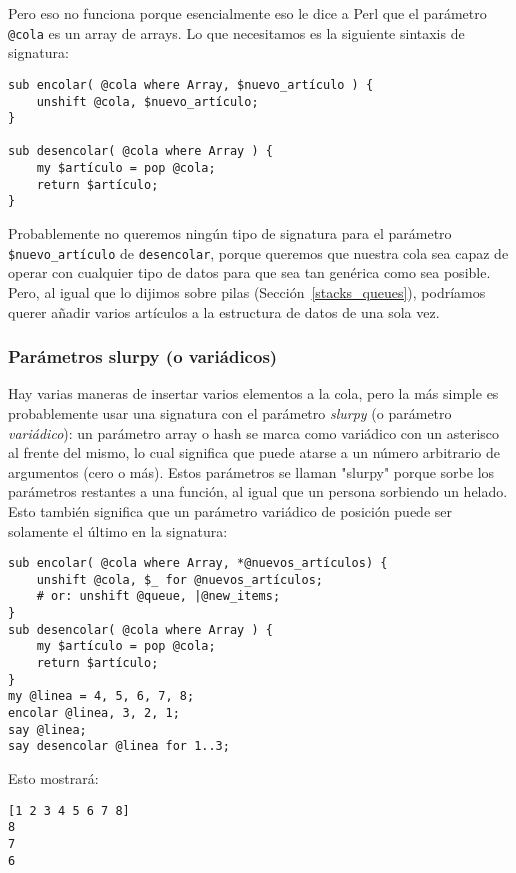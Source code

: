 Pero eso no funciona porque esencialmente eso le dice a Perl
que el parámetro \verb|@cola| es un array de arrays. Lo que necesitamos
es la siguiente sintaxis de signatura:

\begin{verbatim}
sub encolar( @cola where Array, $nuevo_artículo ) {
	unshift @cola, $nuevo_artículo;
}

sub desencolar( @cola where Array ) {
	my $artículo = pop @cola;
	return $artículo;
}	
\end{verbatim}

Probablemente no queremos ningún tipo de signatura para el
parámetro \verb|$nuevo_artículo| de {\tt desencolar}, porque 
queremos que nuestra cola sea capaz de operar con cualquier 
tipo de datos para que sea tan genérica como sea
posible. Pero, al igual que lo dijimos sobre pilas (Sección~\ref{stacks_queues}), 
podríamos querer añadir varios artículos a la estructura de
datos de una sola vez.

\subsubsection{Parámetros slurpy (o variádicos)}

\label{slurpy_params}
Hay varias maneras de insertar varios elementos a la cola,
pero la más simple es probablemente usar una signatura
con el parámetro \emph{slurpy} (o parámetro \emph{variádico}):
un parámetro array o hash se marca como variádico con un asterisco
al frente del mismo, lo cual significa que puede atarse a un
número arbitrario de argumentos (cero o más). Estos parámetros
se llaman "slurpy" porque sorbe los parámetros restantes
a una función, al igual que un persona sorbiendo un helado.
Esto también significa que un parámetro variádico de posición
puede ser solamente el último en la signatura:

\begin{verbatim}
sub encolar( @cola where Array, *@nuevos_artículos) {
    unshift @cola, $_ for @nuevos_artículos;
    # or: unshift @queue, |@new_items;
}
sub desencolar( @cola where Array ) {
    my $artículo = pop @cola;
    return $artículo;
}
my @linea = 4, 5, 6, 7, 8;
encolar @linea, 3, 2, 1;
say @linea;
say desencolar @linea for 1..3;
\end{verbatim}

Esto mostrará:

\begin{verbatim}
[1 2 3 4 5 6 7 8]
8
7
6
\end{verbatim}

